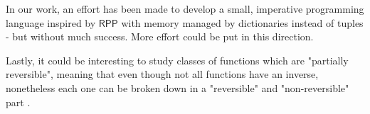 \documentclass{book}
\theoremstyle{definition}
\theoremstyle{remark}
\theoremstyle{plain}
\newcommand{\RPP}{\mathsf{RPP}}
\begin{document}
In our work, an effort has been made to develop a small, imperative programming language
inspired by $\RPP$ with memory managed by dictionaries instead of tuples - but without much success.
More effort could be put in this direction.

Lastly, it could be interesting to study classes of functions which are "partially reversible",
meaning that even though not all functions have an inverse, nonetheless each one can be broken down
in a "reversible" and "non-reversible" part \cite{DBLP:conf/rc/MatosPR21}.



\end{document}
